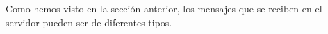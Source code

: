 
Como hemos visto en la sección anterior, los mensajes que se reciben en el servidor pueden ser de diferentes tipos.
